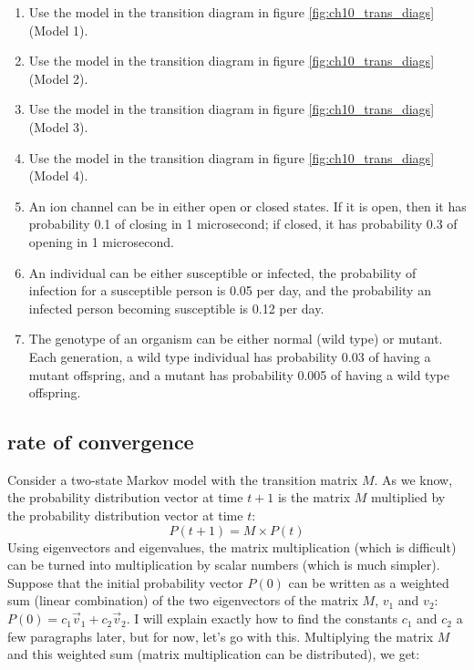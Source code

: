 \documentclass[
  letterpaper,
  DIV=11,
  numbers=noendperiod]{scrreprt}
\begin{document}
\begin{enumerate}
\def\labelenumi{\arabic{enumi}.}
\item
  Use the model in the transition diagram in figure
  \ref{fig:ch10_trans_diags} (Model 1).
\item
  Use the model in the transition diagram in figure
  \ref{fig:ch10_trans_diags} (Model 2).
\item
  Use the model in the transition diagram in figure
  \ref{fig:ch10_trans_diags} (Model 3).
\item
  Use the model in the transition diagram in figure
  \ref{fig:ch10_trans_diags} (Model 4).
\item
  An ion channel can be in either open or closed states. If it is open,
  then it has probability 0.1 of closing in 1 microsecond; if closed, it
  has probability 0.3 of opening in 1 microsecond.
\item
  An individual can be either susceptible or infected, the probability
  of infection for a susceptible person is 0.05 per day, and the
  probability an infected person becoming susceptible is 0.12 per day.
\item
  The genotype of an organism can be either normal (wild type) or
  mutant. Each generation, a wild type individual has probability 0.03
  of having a mutant offspring, and a mutant has probability 0.005 of
  having a wild type offspring.
\end{enumerate}

\subsection{rate of convergence}

Consider a two-state Markov model with the transition matrix \(M\). As
we know, the probability distribution vector at time \(t+1\) is the
matrix \(M\) multiplied by the probability distribution vector at time
\(t\): \[ P(t+1) = M \times P(t) \] Using eigenvectors and eigenvalues,
the matrix multiplication (which is difficult) can be turned into
multiplication by scalar numbers (which is much simpler). Suppose that
the initial probability vector \(P(0)\) can be written as a weighted sum
(linear combination) of the two eigenvectors of the matrix \(M\),
\(v_1\) and \(v_2\): \(P(0) = c_1 \vec v_1 + c_2 \vec v_2\). I will
explain exactly how to find the constants \(c_1\) and \(c_2\) a few
paragraphs later, but for now, let's go with this. Multiplying the
matrix \(M\) and this weighted sum (matrix multiplication can be
distributed), we get:
\end{document}
